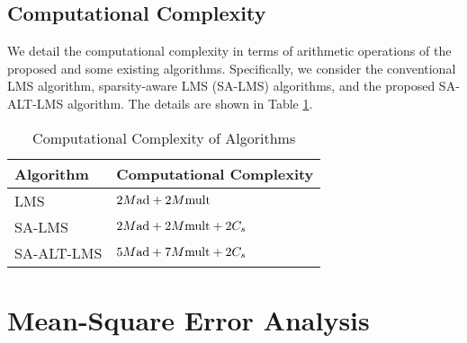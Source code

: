 \documentclass[10pt,onecolumn]{IEEEtran}
\begin{document}
\subsection{Computational Complexity}

We detail the computational complexity in terms of arithmetic
operations of the proposed and some existing algorithms.
Specifically, we consider the conventional LMS algorithm,
sparsity-aware LMS (SA-LMS) algorithms, and the proposed SA-ALT-LMS
algorithm. The details are shown in Table \ref{table2}.

\begin{table}[h]
\centering \small \vspace{-0.75em} \caption{Computational Complexity
of Algorithms} \vspace{-1.0em}
\begin{tabular}{ll}
\hline
Algorithm & Computational Complexity \\
\hline
 LMS & $2M{\rm ad} + 2M{\rm mult}$ \\
SA-LMS & $2M{\rm ad} + 2M{\rm mult} + 2C_s$\\
SA-ALT-LMS & $5M{\rm ad} + 7M{\rm mult} + 2C_s$ \\
\hline
\end{tabular}
\label{table2}
\end{table}
\vspace{-1.0em}

\section{Mean-Square Error Analysis}
\end{document}
